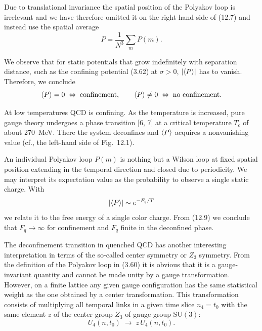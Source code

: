Due to translational invariance the spatial position of the Polyakov loop is
irrelevant and we have therefore omitted it on the right-hand side of (12.7)
and instead use the spatial average
\begin{equation}
  P = \frac{1}{N^3}\sum_m P(m).
\end{equation}

We observe that for static potentials that grow indefinitely with separation
distance, such as the confining potential (3.62) at $\sigma > 0$,
$\left|\left\langle P \right\rangle\right|$ has to vanish. Therefore, we conclude
\begin{equation}
  \left\langle P \right\rangle = 0 \;\Leftrightarrow\; \text{confinement},
  \qquad
  \left\langle P \right\rangle \ne 0 \;\Leftrightarrow\; \text{no confinement}.
\end{equation}

At low temperatures QCD is confining. As the temperature is increased, pure
gauge theory undergoes a phase transition [6, 7] at a critical temperature
$T_c$ of about 270~MeV. There the system deconfines and $\left\langle P \right\rangle$ acquires a
nonvanishing value (cf., the left-hand side of Fig.~12.1).

An individual Polyakov loop $P(m)$ is nothing but a Wilson loop at fixed
spatial position extending in the temporal direction and closed due to
periodicity. We may interpret its expectation value as the probability to
observe a single static charge. With
\begin{equation}
  \left|\left\langle P \right\rangle\right| \sim e^{-F_q/T}
\end{equation}
we relate it to the free energy of a single color charge. From (12.9) we
conclude that $F_q \to \infty$ for confinement and $F_q$ finite in the
deconfined phase.

The deconfinement transition in quenched QCD has another interesting
interpretation in terms of the so-called center symmetry or $Z_3$ symmetry.
From the definition of the Polyakov loop in (3.60) it is obvious that it is a
gauge-invariant quantity and cannot be made unity by a gauge transformation.
However, on a finite lattice any given gauge configuration has the same
statistical weight as the one obtained by a center transformation. This
transformation consists of multiplying all temporal links in a given time slice
$n_4 = t_0$ with the same element $z$ of the center group $Z_3$ of gauge group
$\mathrm{SU}(3)$:
\begin{equation}
  U_4(n,t_0) \;\to\; z\,U_4(n,t_0).
\end{equation}

